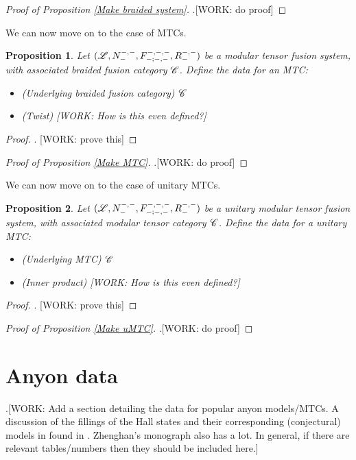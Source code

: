 \documentclass{article}
\newtheorem{proposition}{Proposition}[section]
\theoremstyle{definition}
\numberwithin{figure}{section}
\begin{document}
\begin{proof}[Proof of Proposition \ref{Make braided system}] .[WORK: do proof]
\end{proof}

We can now move on to the case of MTCs.

\begin{proposition} Let $(\mathscr{L},N^{\--,\--}_{\--},F^{\--,\--,\--}_{\--;\--,\--},R^{\--,\--}_{\--})$ be a modular tensor fusion system, with associated braided fusion category $\mathscr{C}$.  Define the data for an MTC:

\begin{itemize}
\item (Underlying braided fusion category)  $\mathscr{C}$
\item (Twist) [WORK: How is this even defined?]
\end{itemize}
\end{proposition}
\begin{proof}. [WORK: prove this]
\end{proof}

\begin{proof}[Proof of Proposition \ref{Make MTC}] .[WORK: do proof]
\end{proof}

We can now move on to the case of unitary MTCs.

\begin{proposition} Let $(\mathscr{L},N^{\--,\--}_{\--},F^{\--,\--,\--}_{\--;\--,\--},R^{\--,\--}_{\--})$ be a unitary modular tensor fusion system, with associated modular tensor category $\mathscr{C}$.  Define the data for a unitary MTC:

\begin{itemize}
\item (Underlying MTC)  $\mathscr{C}$
\item (Inner product) [WORK: How is this even defined?]
\end{itemize}
\end{proposition}
\begin{proof}. [WORK: prove this]
\end{proof}


\begin{proof}[Proof of Proposition \ref{Make uMTC}] .[WORK: do proof]
\end{proof}

\section{Anyon data}

.[WORK: Add a section detailing the data for popular anyon models/MTCs. A discussion of the fillings of the Hall states and their corresponding (conjectural) models in found in \cite{bruillard2017fermionic}. Zhenghan's monograph also has a lot. In general, if there are relevant tables/numbers then they should be included here.]



\end{document}
